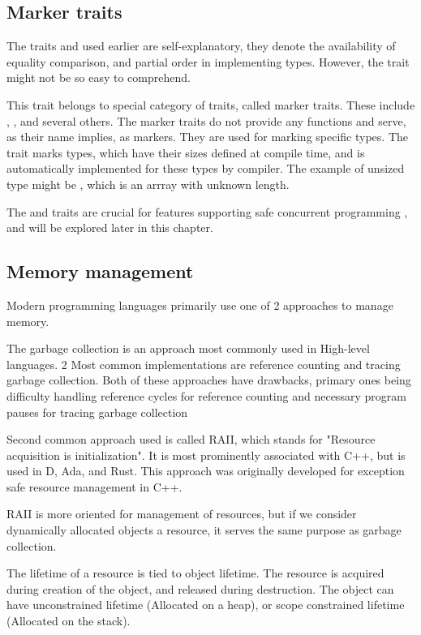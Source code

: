 \subsection{Marker traits}
The traits  and  used earlier are self-explanatory, they denote the availability of equality comparison, and partial order
in implementing types. However, the  trait might not be so easy to comprehend.

This trait belongs to special category of traits, called marker traits. These include  , ,  and several others.
The marker traits do not provide any functions and serve, as their name implies, as markers. They are used for marking specific
types. The  trait marks types, which have their sizes defined at compile time, and is automatically implemented
for these types by compiler. The example of unsized type might be \type{[u8]} , which is an arrray with unknown length.

The  and  traits are crucial for features supporting safe concurrent programming , and will be explored later in
this chapter.

\subsection{Memory management}
Modern programming languages primarily use one of 2 approaches to manage memory.

The garbage collection is an approach most commonly used in High-level languages. 2 Most common implementations
are reference counting and tracing garbage collection. Both of these approaches have drawbacks, primary ones being
difficulty handling reference cycles for reference counting and necessary program pauses for tracing garbage collection

Second common approach used is called RAII, which stands for "Resource acquisition is initialization". It is most
prominently associated with C++, but is used in D, Ada, and Rust. This approach was originally developed for exception safe
resource management in C++\cite{stroustrup2015brief}.

RAII is more oriented for management of resources, but if we consider dynamically allocated objects a resource, it serves
the same purpose as garbage collection.

The lifetime of a resource is tied to object lifetime. The resource is acquired during creation of the object,
and released during destruction. The object can have unconstrained lifetime (Allocated on a heap), or scope constrained
lifetime (Allocated on the stack).

